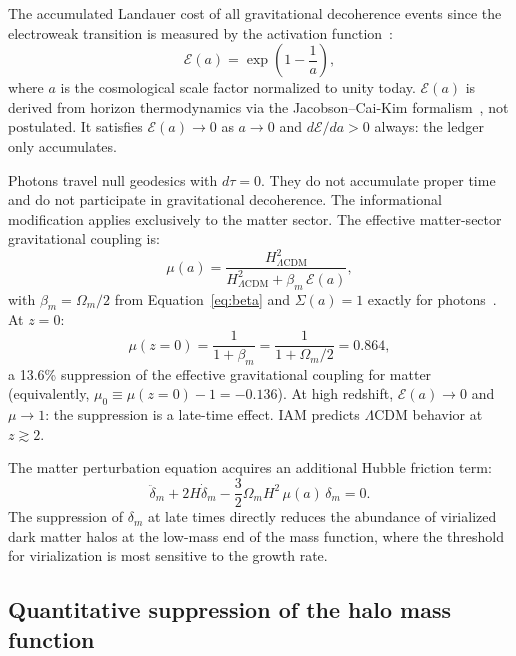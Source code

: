 \documentclass[12pt,a4paper]{article}
\begin{document}
The accumulated Landauer cost of all gravitational decoherence events since
the electroweak transition is measured by the activation
function~\citep{IAM_theory}:
\begin{equation}
\mathcal{E}(a) = \exp\!\left(1 - \frac{1}{a}\right),
\label{eq:Ea}
\end{equation}
where $a$ is the cosmological scale factor normalized to unity today.
$\mathcal{E}(a)$ is derived from horizon thermodynamics via the
Jacobson--Cai-Kim formalism~\citep{Jacobson1995,CaiKim2005}, not postulated.
It satisfies $\mathcal{E}(a) \to 0$ as $a \to 0$ and $d\mathcal{E}/da > 0$
always: the ledger only accumulates.

Photons travel null geodesics with $d\tau = 0$. They do not accumulate proper
time and do not participate in gravitational decoherence. The informational
modification applies exclusively to the matter sector. The effective
matter-sector gravitational coupling is:
\begin{equation}
\mu(a) = \frac{H^2_{\Lambda\mathrm{CDM}}}{H^2_{\Lambda\mathrm{CDM}}
+ \beta_m\,\mathcal{E}(a)},
\label{eq:mu}
\end{equation}
with $\beta_m = \Omega_m/2$ from Equation~\ref{eq:beta} and $\Sigma(a) = 1$
exactly for photons~\citep{IAM_obs}. At $z = 0$:
\begin{equation}
\mu(z{=}0) = \frac{1}{1 + \beta_m} = \frac{1}{1 + \Omega_m/2} = 0.864,
\label{eq:mu0}
\end{equation}
a 13.6\% suppression of the effective gravitational coupling for matter
(equivalently, $\mu_0 \equiv \mu(z{=}0) - 1 = -0.136$). At
high redshift, $\mathcal{E}(a) \to 0$ and $\mu \to 1$: the suppression is
a late-time effect. IAM predicts $\Lambda$CDM behavior at $z \gtrsim 2$.

The matter perturbation equation acquires an additional Hubble friction term:
\begin{equation}
\ddot{\delta}_m + 2H\dot{\delta}_m
- \frac{3}{2}\Omega_m H^2\,\mu(a)\,\delta_m = 0.
\label{eq:perturb}
\end{equation}
The suppression of $\delta_m$ at late times directly reduces the abundance
of virialized dark matter halos at the low-mass end of the mass function,
where the threshold for virialization is most sensitive to the growth rate.

\subsection{Quantitative suppression of the halo mass function}
\end{document}
